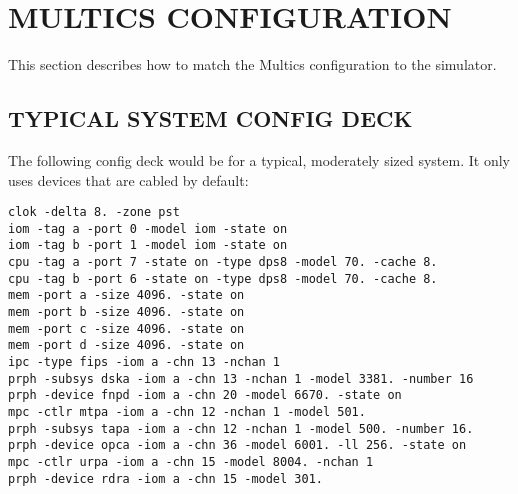 \section[Multics Configuration]{MULTICS CONFIGURATION}

This section describes how to match the Multics configuration to the simulator.

\subsection[Typical System Config Deck]{TYPICAL SYSTEM CONFIG DECK}

The following config deck would be for a typical, moderately sized system. It only uses
devices that are cabled by default:

\begin{adjustwidth}{5ex}{1ex}
    \texttt{clok -delta 8. -zone pst} \\
    \texttt{iom  -tag a -port 0 -model iom -state on} \\
    \texttt{iom  -tag b -port 1 -model iom -state on} \\
    \texttt{cpu  -tag a -port 7 -state on -type dps8 -model 70. -cache 8.} \\
    \texttt{cpu  -tag b -port 6 -state on -type dps8 -model 70. -cache 8.} \\
    \texttt{mem  -port a -size 4096. -state on} \\
    \texttt{mem  -port b -size 4096. -state on} \\
    \texttt{mem  -port c -size 4096. -state on} \\
    \texttt{mem  -port d -size 4096. -state on} \\
    \texttt{ipc  -type fips   -iom a -chn 13 -nchan 1} \\
    \texttt{prph -subsys dska -iom a -chn 13 -nchan 1 -model 3381. -number 16} \\
    \texttt{prph -device fnpd -iom a -chn 20 -model 6670. -state on} \\
    \texttt{mpc  -ctlr   mtpa -iom a -chn 12 -nchan 1 -model 501.} \\
    \texttt{prph -subsys tapa -iom a -chn 12 -nchan 1 -model 500. -number 16.} \\
    \texttt{prph -device opca -iom a -chn 36 -model 6001. -ll 256. -state on} \\
    \texttt{mpc  -ctlr   urpa -iom a -chn 15 -model 8004. -nchan 1} \\
    \texttt{prph -device rdra -iom a -chn 15 -model 301.} \\

\end{adjustwidth}
